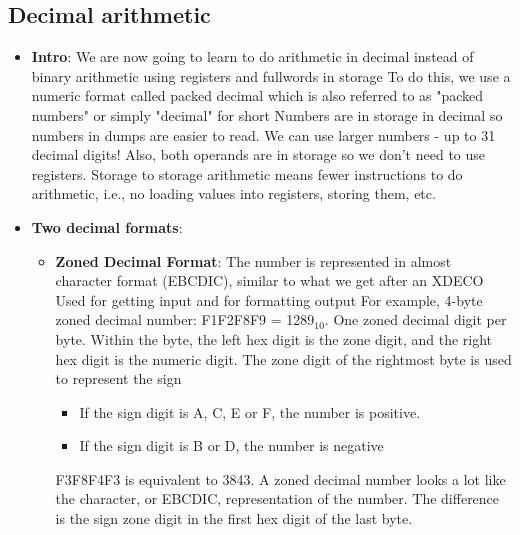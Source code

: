 \documentclass{report}
\begin{document}
    \subsection{Decimal arithmetic}
    \begin{itemize}
        \item \textbf{Intro}: We are now going to learn to do arithmetic in decimal instead of binary arithmetic using registers and fullwords in storage
            \bigbreak \noindent 
            To do this, we use a numeric format called packed decimal which is also referred to as "packed numbers" or simply "decimal" for short
            \bigbreak \noindent 
            Numbers are in storage in decimal so numbers in dumps are easier to read. We can use larger numbers - up to 31 decimal digits! 
            \bigbreak \noindent 
            Also, both operands are in storage so we don't need to use registers. Storage to storage arithmetic means fewer instructions to do arithmetic, i.e., no loading values into registers, storing them, etc.
        \item \textbf{Two decimal formats}:
            \begin{itemize}
                \item \textbf{Zoned Decimal Format}: The number is represented in almost character format (EBCDIC), similar to what we get after an XDECO
                    \bigbreak \noindent 
                    Used for getting input and for formatting output
                    \bigbreak \noindent 
                    For example, 4-byte zoned decimal number: F1F2F8F9 = 1289$_{10}$. One zoned decimal digit per byte. Within the byte, the left hex digit is the zone digit, and the right hex digit is the numeric digit.
                    \bigbreak \noindent 
                    The zone digit of the rightmost byte is used to represent the sign
                    \begin{itemize}
                        \item If the sign digit is A, C, E or F, the number is positive.
                        \item If the sign digit is B or D, the number is negative
                    \end{itemize}
                    \bigbreak \noindent 
                    F3F8F4F3 is equivalent to 3843. A zoned decimal number looks a lot like the character, or EBCDIC, representation of the number. The difference is the sign zone digit in the first hex digit of the last byte.
                    \bigbreak \noindent 

\end{itemize}
\end{itemize}
\end{document}
